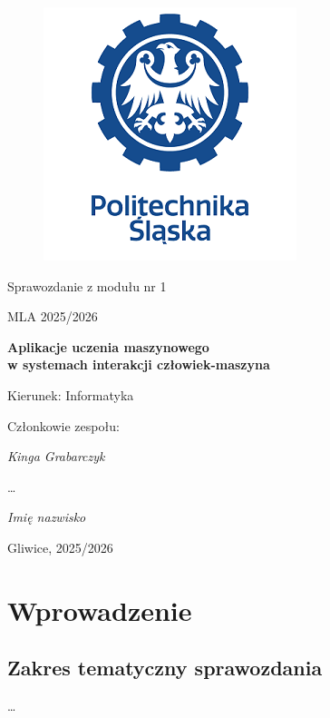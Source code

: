 \documentclass[12pt,a4paper]{article}
\begin{document}
\nocite{*}
\clearpage
\begin{figure}[h]
\centering
\includegraphics{media/ps-logo.png}
\end{figure}
\hspace{3cm}
\begin{center}Sprawozdanie z modułu nr 1\end{center}
\begin{center}MLA 2025/2026\end{center}
\hspace{3cm}
\begin{center}\large\textbf{Aplikacje uczenia maszynowego \\w systemach interakcji człowiek-maszyna}\end{center}
\hspace{7cm}
\begin{flushright}Kierunek: Informatyka
\end{flushright}
\begin{flushright}Członkowie zespołu:
\par
\textit{Kinga Grabarczyk}
\par
\ldots
\par
\textit{Imię nazwisko}
\end{flushright}
\vfill
\begin{center}Gliwice, 2025/2026\end{center}\newpage
{}
\tableofcontents
\newpage
\section{Wprowadzenie}
\subsection{Zakres tematyczny sprawozdania}
\ldots 
\end{document}
